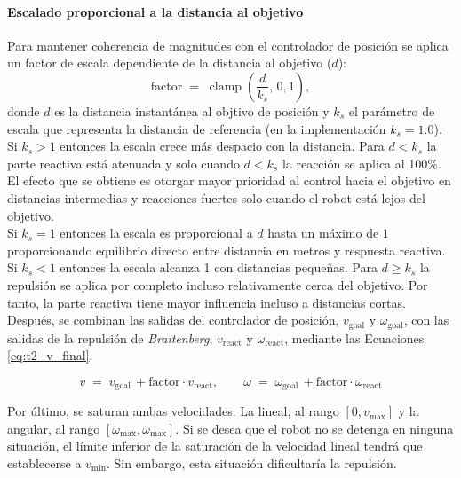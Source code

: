 \paragraph{Escalado proporcional a la distancia al objetivo}
Para mantener coherencia de magnitudes con el controlador de posición se aplica
un factor de escala dependiente de la distancia al objetivo ($d$):
\begin{equation}
\mathrm{factor} \;=\; \operatorname{clamp}\!\left(\frac{d}{k_s},\,0,1\right),
\label{eq:scale}
\end{equation}
donde $d$ es la distancia instantánea al objtivo de posición y $k_s$
el parámetro de escala que representa la distancia de referencia
(en la implementación $k_s = 1.0$). \\

Si $k_s > 1$ entonces la escala crece más despacio con la distancia. Para 
$d < k_s$ la parte reactiva está atenuada y solo cuando $d < k_s$
la reacción se aplica al 100\%. El efecto que se obtiene es otorgar mayor
prioridad al control hacia el objetivo en distancias intermedias y
reacciones fuertes solo cuando el robot está lejos del objetivo. \\

Si $k_s = 1$ entonces la escala es proporcional a $d$ hasta un máximo de $1$ 
proporcionando equilibrio directo entre distancia en metros y respuesta reactiva. \\

Si $k_s < 1$ entonces la escala alcanza 1 con distancias pequeñas. Para 
$d ≥ k_s$ la repulsión se aplica por completo incluso relativamente cerca del objetivo. 
Por tanto, la parte reactiva tiene mayor influencia incluso a distancias cortas. \\

Después, se combinan las salidas del controlador de posición, $v_{\text{goal}}$
y $\omega_{\text{goal}}$, con las salidas de la repulsión de \textit{Braitenberg},
$v_{\text{react}}$ y $\omega_{\text{react}}$, mediante las Ecuaciones \ref{eq:t2_v_final}.

\begin{equation}
v \;=\; v_{\text{goal}}\, + \mathrm{factor}\cdot v_{\text{react}},\qquad
\omega \;=\; \omega_{\text{goal}}\, + \mathrm{factor}\cdot \omega_{\text{react}}
\label{eq:t2_v_final}
\end{equation}

Por último, se saturan ambas velocidades. La lineal, al rango $[0, v_{\text{max}}]$ y 
la angular, al rango $[\omega_{\text{max}}, \omega_{\text{max}}]$. Si se desea 
que el robot no se detenga en ninguna situación, el límite inferior de la saturación
de la velocidad lineal tendrá que establecerse a $v_{\text{min}}$. Sin embargo,
esta situación dificultaría la repulsión. \\

